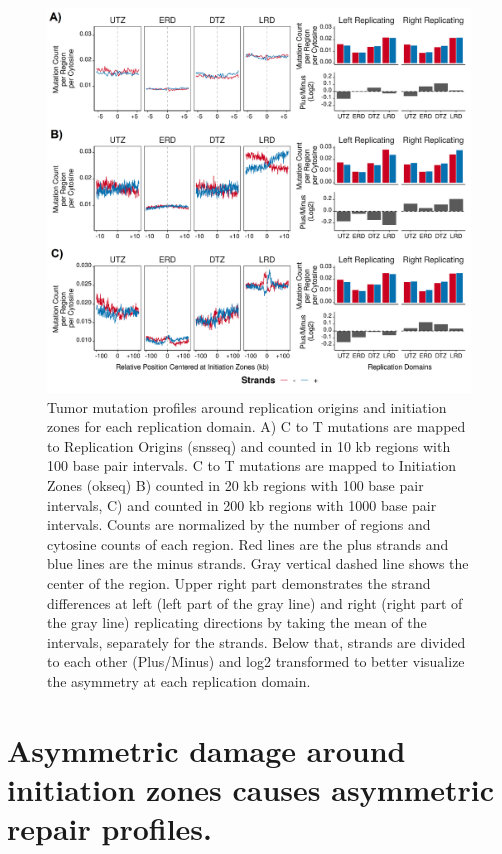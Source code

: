 \begin{figure}[H]
    \begin{center}
    \includegraphics[width=\textwidth]{Chapters/4_results/figures/fig4}
    \caption[Tumor mutation profiles around replication origins and initiation zones for each replication domain.]{Tumor mutation profiles around replication origins and initiation zones for each replication domain. A) C to T mutations are mapped to Replication Origins (\gls{snsseq}) and counted in 10 kb regions with 100 base pair intervals. C to T mutations are mapped to Initiation Zones (\gls{okseq}) B) counted in 20 kb regions with 100 base pair intervals, C) and counted in 200 kb regions with 1000 base pair intervals. Counts are normalized by the number of regions and cytosine counts of each region. Red lines are the plus strands and blue lines are the minus strands. Gray vertical dashed line shows the center of the region. Upper right part demonstrates the strand differences at left (left part of the gray line) and right (right part of the gray line) replicating directions by taking the mean of the intervals, separately for the strands. Below that, strands are divided to each other (Plus/Minus) and log2 transformed to better visualize the asymmetry at each replication domain.}
    \label{fig:mutation}
    \end{center}
    \end{figure}

\section{Asymmetric damage around initiation zones causes asymmetric repair profiles.}

